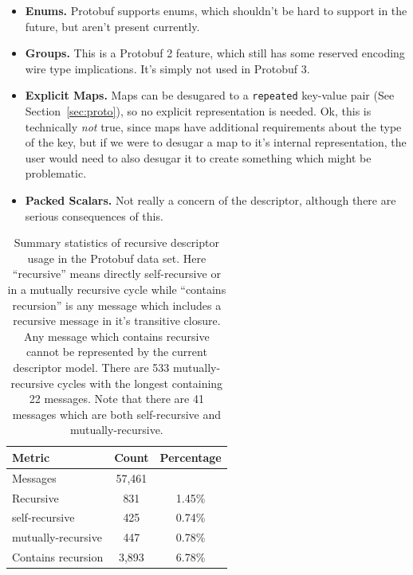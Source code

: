 \begin{itemize}
\item \textbf{Enums.} Protobuf supports enums, which shouldn't be hard to
  support in the future, but aren't present currently.

\item \textbf{Groups.} This is a Protobuf 2 feature, which still has some
  reserved encoding wire type implications. It's simply not used in Protobuf 3.

\item \textbf{Explicit Maps.} Maps can be desugared to a \texttt{repeated}
  key-value pair (See Section~\ref{sec:proto}), so no explicit representation is
  needed. Ok, this is technically \emph{not} true, since maps have additional
  requirements about the type of the key, but if we were to desugar a map to
  it's internal representation, the user would need to also desugar it to create
  something which might be problematic.

\item \textbf{Packed Scalars.} Not really a concern of the descriptor, although
  there are serious consequences of this.
\end{itemize}

\begin{table}[H]
\centering
\begin{tabular}{lcc}
    \toprule
    Metric & Count & Percentage \\
    \midrule
    Messages & 57,461 & \\
    Recursive & 831 & 1.45\% \\
    \bullet{} self-recursive & 425 & 0.74\% \\
    \bullet{} mutually-recursive & 447 & 0.78\% \\
    Contains recursion & 3,893 & 6.78\% \\
    \bottomrule
\end{tabular}
\caption[Summary of recursive protobuf messages.]{Summary statistics of
    recursive descriptor usage in the Protobuf data set. Here ``recursive''
    means directly self-recursive or in a mutually recursive cycle while
    ``contains recursion'' is any message which includes a recursive message in
    it's transitive closure. Any message which contains recursive cannot be
    represented by the current descriptor model. There are 533
    mutually-recursive cycles with the longest containing 22 messages. Note
    that there are 41 messages which are both self-recursive and
    mutually-recursive.}\label{tab:recur-summary}
\end{table}

